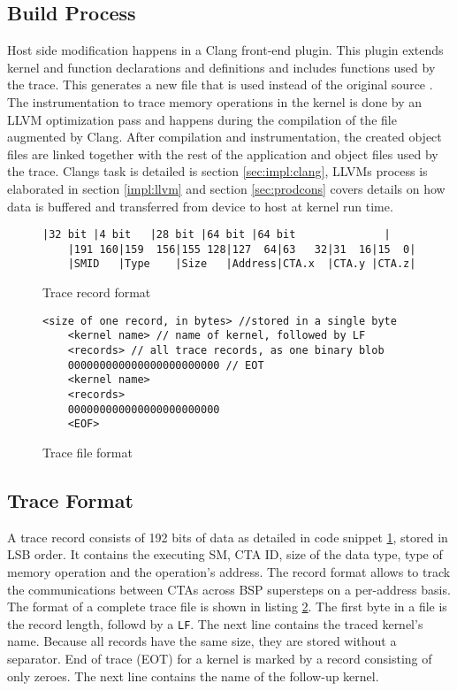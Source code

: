 \subsection{Build Process}
Host side modification happens in a Clang front-end plugin. This plugin extends kernel and function declarations and definitions and includes functions used by the trace. This generates a new file that is used instead of the original source . The instrumentation to trace memory operations in the kernel is done by an LLVM optimization pass and happens during the compilation of the file augmented by Clang. After compilation and instrumentation, the created object files are linked together with the rest of the application and object files used by the trace.
Clangs task is detailed is section \ref{sec:impl:clang}, LLVMs process is elaborated in section \ref{impl:llvm} and section \ref{sec:prodcons} covers details on how data is buffered and transferred from device to host at kernel run time.
\begin{figure}[t]
	\begin{lstlisting}[style=C]
	|32 bit |4 bit   |28 bit |64 bit |64 bit        	  |
	|191 160|159  156|155 128|127  64|63   32|31  16|15  0|
	|SMID   |Type    |Size   |Address|CTA.x  |CTA.y |CTA.z|	\end{lstlisting}
	\caption{Trace record format}
	\label{trace rec}
\end{figure}
\begin{figure}[t]
	\begin{lstlisting}[style=C]
	<size of one record, in bytes> //stored in a single byte
	<kernel name> // name of kernel, followed by LF
	<records> // all trace records, as one binary blob
	000000000000000000000000 // EOT
	<kernel name>
	<records>
	000000000000000000000000
	<EOF>	\end{lstlisting}
	\caption{Trace file format}
	\label{trace file}
\end{figure}
\subsection{Trace Format}
A trace record consists of 192 bits of data as detailed in code snippet \ref{trace rec}, stored in LSB order. It contains the executing SM, CTA ID, size of the data type, type of memory operation and the operation's address. The record format allows to track the communications between CTAs across BSP supersteps on a per-address basis. 
The format of a complete trace file is shown in listing \ref{trace file}. The first byte in a file is the record length, followd by a \verb|LF|. The next line contains the
traced kernel's name. Because all records have the same size, they are stored without a separator. End of trace (EOT) for a kernel is marked by a record consisting of only zeroes. The next line contains the name of the follow-up kernel.




